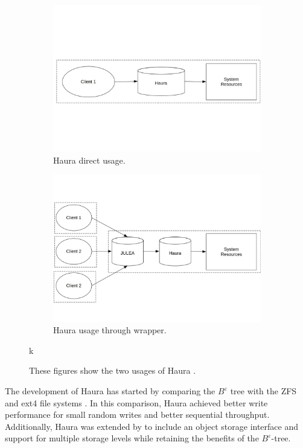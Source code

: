 \documentclass[
	12pt,
	a4paper,
	abstract,
	bibliography=totoc,
	chapterprefix,
	headings=openright,
	numbers=endperiod,
	parskip=half,
	twoside,
]{scrreprt}
\begin{document}
\begin{figure}[H]
	\centering
	\begin{subfigure}{0.4\textwidth}
		\includegraphics[width=\textwidth]{haura_directly.jpg}		
		\caption{Haura direct usage.}
		\label{fig:randread zipf}
	\end{subfigure}
	\hfill
	\begin{subfigure}{0.4\textwidth}
		\includegraphics[width=\textwidth]{haura_wrapper.jpg}		
		\caption{Haura usage through wrapper.}
		\label{fig:randread normal}
	\end{subfigure}k
	
	\caption{These figures show the two usages of Haura \cite{hauraDocu}.}
	\label{fig:haura usage}
\end{figure}

The development of Haura has started by comparing the $B^{\varepsilon}$ tree with the ZFS and ext4 file systems \cite{wiedemann2018modern}.
In this comparison, Haura achieved better write performance for small random writes and better sequential throughput.
Additionally, Haura was extended by \cite{hoppner2021design} to include an object storage interface and 
support for multiple storage levels while retaining the benefits of the $B^{\varepsilon}$-tree.
\end{document}

